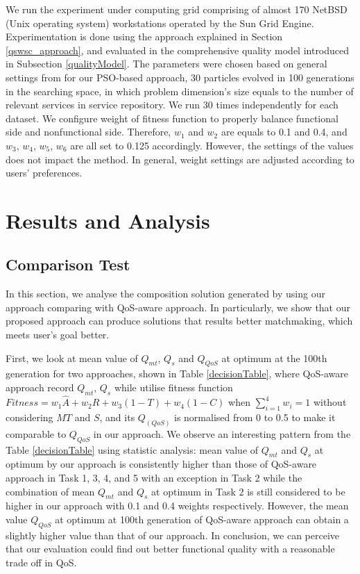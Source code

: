 \documentclass{llncs}
\begin{document}
We run the experiment under computing grid comprising of almost 170 NetBSD (Unix operating system) workstations operated by the Sun Grid Engine. Experimentation is done using the approach explained in Section \ref{qswsc_approach}, and evaluated in the comprehensive quality model introduced in Subsection \ref{qualityModel}. The parameters were chosen based on general settings from \cite{shi2001particle} for our PSO-based approach, 30 particles evolved in 100 generations in the searching space, in which problem dimension's size equals to the number of relevant services in service repository. We run 30 times independently for each dataset. We configure weight of fitness function to properly balance functional side and nonfunctional side. Therefore, $w_{1}$ and $w_{2}$ are equals to 0.1 and 0.4,  and $w_{3}$, $w_{4}$, $w_{5}$, $w_{6}$ are all set to 0.125 accordingly. However, the settings of the values does not impact the method. In general, weight settings are adjusted according to users' preferences.

\section{Results and Analysis}\label{results_analysis}
\subsection{Comparison Test}\label{comparisonTest}

In this section, we analyse the composition solution generated by using our approach comparing with QoS-aware approach. In particularly, we show that our proposed approach can produce solutions that results better matchmaking, which meets user's goal better.
 
First, we look at mean value of $Q_{mt}$, $Q_{s}$ and $Q_{QoS}$ at optimum at the 100th generation for two approaches, shown in Table \ref{decisionTable}, where QoS-aware approach record $Q_{mt}$, $Q_{s}$ while utilise fitness function $Fitness = w_1 \hat{A} + w_2R + w_3(1 - T) + w_4(1 - C)$ when $\sum_{i=1}^{4} w_i = 1$ without considering $MT$ and $S$, and its $Q_(QoS)$ is normalised from 0 to 0.5 to make it comparable to $Q_{QoS}$ in our approach. We observe an interesting pattern from the Table \ref{decisionTable} using statistic analysis: mean value of $Q_{mt}$ and $Q_{s}$ at optimum by our approach is consistently higher than those of QoS-aware approach in Task 1, 3, 4, and 5 with an exception in Task 2 while the combination of mean $Q_{mt}$ and $Q_{s}$ at optimum in Task 2 is still considered to be higher in our approach with 0.1 and 0.4 weights respectively. However, the mean value $Q_{QoS}$ at optimum at 100th generation of QoS-aware approach can obtain a slightly higher value than that of our approach. In conclusion, we can perceive that our evaluation could find out better functional quality with a reasonable trade off in QoS.
\end{document}
